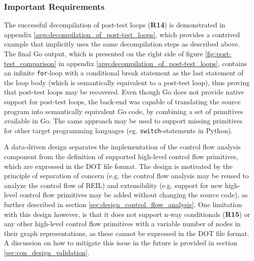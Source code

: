 
\subsubsection{Important Requirements}
\label{sec:eval_control_flow_analysis_library_important_requirements}


The successful decompilation of post-test loops (\textbf{R14}) is demonstrated in appendix \ref{app:decompilation_of_post-test_loops}, which provides a contrived example that implicitly uses the same decompilation steps as described above. The final Go output, which is presented on the right side of figure \ref{fig:post-test_comparison} in appendix \ref{app:decompilation_of_post-test_loops}, contains an infinite \texttt{for}-loop with a conditional break statement as the last statement of the loop body (which is semantically equivalent to a post-test loop), thus proving that post-test loops may be recovered. Even though Go does not provide native support for post-test loops, the back-end was capable of translating the source program into semantically equivalent Go code, by combining a set of primitives available in Go. The same approach may be used to support missing primitives for other target programming languages (eg. \texttt{switch}-statements in Python).


A data-driven design separates the implementation of the control flow analysis component from the definition of supported high-level control flow primitives, which are expressed in the DOT file format. The design is motivated by the principle of separation of concern (e.g. the control flow analysis may be reused to analyze the control flow of REIL) and extensibility (e.g. support for new high-level control flow primitives may be added without changing the source code), as further described in section \ref{sec:design_control_flow_analysis}. One limitation with this design however, is that it does not support n-way conditionals (\textbf{R15}) or any other high-level control flow primitives with a variable number of nodes in their graph representations, as these cannot be expressed in the DOT file format. A discussion on how to mitigate this issue in the future is provided in section \ref{sec:con_design_validation}.
